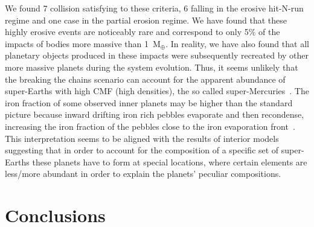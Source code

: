 \documentclass[fleqn,usenatbib]{mnras}
\begin{document}
We found 7 collision satisfying to these criteria, 6 falling in the erosive hit-N-run regime and one case in the partial erosion regime. We have found that these highly erosive events are noticeably rare and correspond to only 5\% of the impacts of bodies more massive than 1~M$_{\oplus}$. In reality, we have also found that all planetary objects produced in these impacts were subsequently  recreated by other more massive planets during the system evolution. Thus, it seems unlikely that the breaking the chains scenario can account for the apparent abundance of super-Earths with high CMF (high densities), the so called super-Mercuries~\cite[e.g.][]{adibekyanetal21}. The iron fraction of some observed inner planets may be higher than the standard picture because inward drifting iron rich pebbles evaporate and then recondense, increasing the iron fraction of the pebbles close to the iron evaporation front~\citep[e.g.][]{aguichineetal20}. This interpretation seems to be aligned with the results of interior models~\citep{Dornetal19} suggesting that in order to account for the composition of a specific set of super-Earths these planets have to form at special locations, where certain elements are less/more abundant in order to explain the planets' peculiar compositions.

\section{Conclusions}\label{sec:conclusion}
\end{document}
